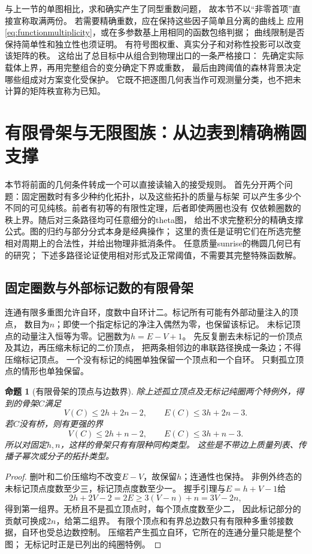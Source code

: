 \documentclass[11pt,a4paper]{ctexart}
\theoremstyle{cnplain}\newtheorem{theorem}{定理}[section]
\newtheorem{proposition}[theorem]{命题}
\theoremstyle{definition}\newtheorem{definition}[theorem]{定义}
\theoremstyle{remark}\newtheorem{remark}[theorem]{注}
\begin{document}
与上一节的单图相比，求和确实产生了同型重数问题，
故本节不以“非零首项”直接宣称取满两份。
若需要精确重数，应在保持这些因子简单且分离的曲线上
应用\eqref{eq:functionmultiplicity}，或在多参数基上用相同的函数包络判据；
曲线限制是否保持简单性和独立性也须证明。
有符号图权重、真实分子和对称性投影可以改变该矩阵的秩。
这给出了总目标中从组合到物理出口的一条严格接口：
先确定实际载体上界，再用完整组合的变分确定下界或重数，
最后由跨阈值的森林背景决定哪些组成对方案变化受保护。
它既不把逐图几何表当作可观测量分类，也不把未计算的矩阵秩宣称为已知。


\section{有限骨架与无限图族：从边表到精确椭圆支撑}
\label{sec:finitecores}
本节将前面的几何条件转成一个可以直接读输入的接受规则。
首先分开两个问题：固定圈数时有多少种约化拓扑，以及这些拓扑的质量与标架
可以产生多少个不同的可见纯核。前者有初等的有限性定理，后者即使两圈也没有
仅依赖圈数的秩上界。随后对三条路径均可任意细分的theta图，
给出不求完整积分的精确支撑公式。图的归约与部分分式本身是经典操作；
这里的责任是证明它们在所选完整相对周期上的合法性，并给出物理非抵消条件。
任意质量sunrise的椭圆几何已有\cite{ABWsun,BKVsun}的研究；
下述多路径论证使用相对形式及正常阈值，不需要其完整特殊函数解。

\subsection{固定圈数与外部标记数的有限骨架}
连通有限多重图允许自环，度数中自环计二。标记所有可能有外部动量注入的顶点，
数目为$n$；即使一个指定标记的净注入偶然为零，也保留该标记。
未标记顶点的动量注入恒等为零。记圈数为$h=E-V+1$。
先反复删去未标记的一价顶点及其边，再压缩未标记的二价顶点，
把两条相邻边的串联路径换成一条边；不得压缩标记顶点。
一个没有标记的纯圈单独保留一个顶点和一个自环。
只剩孤立顶点的情形也单独保留。

\begin{proposition}[有限骨架的顶点与边数界]\label{prop:finitecore}
除上述孤立顶点及无标记纯圈两个特例外，得到的骨架$C$满足
\[
 V(C)\le 2h+2n-2,\qquad E(C)\le 3h+2n-3.
\]
若$C$没有桥，则有更强的界
\[
 V(C)\le 2h+n-2,\qquad E(C)\le 3h+n-3.
\]
所以对固定$h,n$，这样的骨架只有有限种同构类型。
这些是不带边上质量列表、传播子幂次或分子的拓扑类型。
\end{proposition}
\begin{proof}
删叶和二价压缩均不改变$E-V$，故保留$h$；连通性也保持。
非例外终态的未标记顶点度数至少三，标记顶点度数至少一。
握手引理与$E=h+V-1$给
\[
 2h+2V-2=2E\ge3(V-n)+n=3V-2n,
\]
得到第一组界。无桥且不是孤立顶点时，每个顶点度数至少二，
因此标记部分的贡献可换成$2n$，给第二组界。
有限个顶点和有界总边数只有有限种多重邻接数据，自环也受总边数控制。
压缩若产生孤立自环，它所在的连通分量只能是整个图；
无标记时正是已列出的纯圈特例。
\end{proof}
\end{document}
